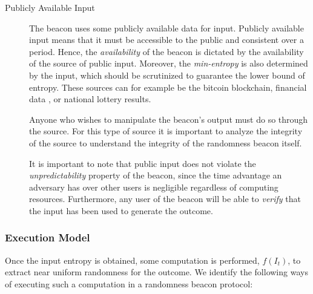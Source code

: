 \begin{description}
    \item[Publicly Available Input]
        The beacon uses some publicly available data for input.
        Publicly available input means that it must be accessible to the public and consistent over a period.
        Hence, the \emph{availability} of the beacon is dictated by the availability of the source of public input.
        Moreover, the \emph{min-entropy} is also determined by the input, which should be scrutinized to guarantee the lower bound of entropy.
        These sources can for example be the bitcoin blockchain\cite{bonneau2015bitcoin, bentov2016bitcoin}, financial data \cite{clark2010use}, or national lottery results.

        Anyone who wishes to manipulate the beacon's output must do so through the source.
        For this type of source it is important to analyze  the integrity of the source to understand the integrity of the randomness beacon itself.

        It is important to note that public input does not violate the \emph{unpredictability} property of the beacon, since the time advantage an adversary has over other users is negligible regardless of computing resources.
        Furthermore, any user of the beacon will be able to \emph{verify} that the input has been used to generate the outcome.

\end{description}

\subsubsection{Execution Model}
Once the input entropy is obtained, some computation is performed, $f(I_t)$, to extract near uniform randomness for the outcome.
We identify the following ways of executing such a computation in a randomness beacon protocol:

